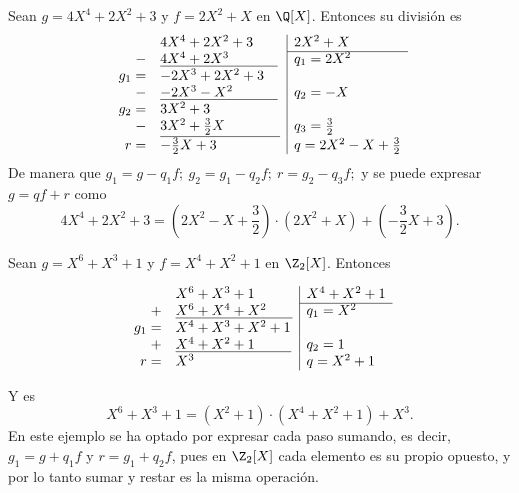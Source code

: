     \begin{ejs}\label{ej:algoritmo_division_polinomio}
        \item Sean $g = 4X^4 + 2X^2 + 3$ y $f = 2X^2 + X$ en $\Q[X]$. Entonces su división es
        \[
            \begin{array}{rl|l}
                &4X^4 + 2X^2 + 3 & 2X^2 + X \\\cline{3-3} 
                - & \underline{4X^4 + 2X^3\phantom{X+ 1x.}} & q_1 = 2X^2\\
                g_1 =&-2X^3 + 2X^2 + 3 &  \\
                -&\underline{-2X^3 - X^2\phantom{X+ 1x}} & q_2 = -X\\
                g_2 =&3X^2 + 3&  \\
                -&\underline{3X^2 + \frac{3}{2}X\phantom{{ X.....} + 1}} & q_3= \frac{3}{2}\\
                r =&-\frac{3}{2}X + 3 &  q = 2X^2 -X + \frac{3}{2}
            \end{array}
        \]
        De manera que \(g_1 = g - q_1f;\ g_2 = g_1 - q_2f;\ r = g_2 - q_3f;\) y se puede expresar $g = qf+ r$ como $$ 4X^4 + 2X^2 + 3 = (2X^2 -X + \frac{3}{2})\cdot (2X^2 + X) + (-\frac{3}{2}X + 3).$$

        \item Sean $g = X^6 + X^3 + 1$ y $f = X^4 + X^2 + 1$ en $\Z_2[X]$. Entonces 
        
        \[
            \begin{array}{rl|l}
                &X^6 + X^3 + 1 & X^4 + X^2 + 1 \\\cline{3-3} 
                + & \underline{X^6 + X^4 + X^2\phantom{Xlll}} & q_1 = X^2\\
                 g_1 =&X^4 + X^3 + X^2 + 1 &  \\
                + &\underline{X^4 + X^2 + 1\phantom{{ X} + 1}} &q_2 =1\\
                 r =&X^3 &  q = X^2 +1
            \end{array}
        \]
        
        Y es $$X^6 + X^3 + 1 = (X^2 + 1)\cdot (X^4 +X^2 + 1) + X^3.$$En este ejemplo se ha optado por expresar cada paso sumando, es decir, $g_1 = g + q_1f$ y $r = g_1 + q_2f$, pues en $\Z_2[X]$ cada elemento es su propio opuesto, y por lo tanto sumar y restar es la misma operación.
    \end{ejs}


